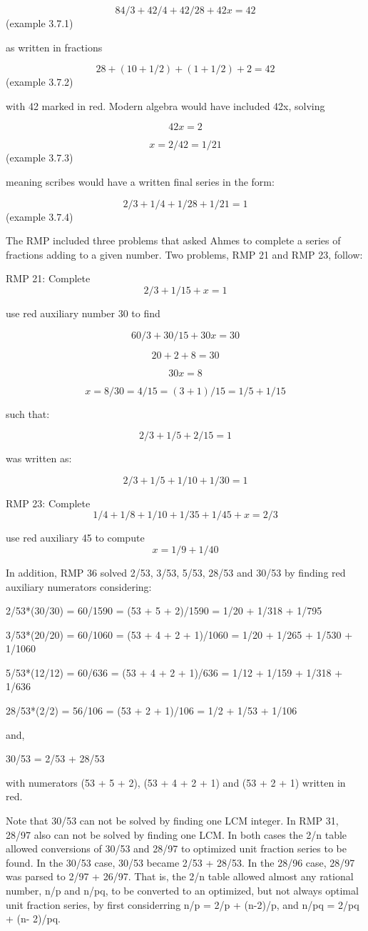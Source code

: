 \documentclass[12pt]{article}
\begin{document}
$$84/3 + 42/4 + 42/28 + 42x = 42$$ (example 3.7.1)

as written in fractions

$$28 + (10 + 1/2) + (1 + 1/2) + 2 = 42$$ (example 3.7.2)

with 42 marked in red. Modern algebra would have included 42x, solving

$$42x = 2$$

$$x = 2/42 = 1/21$$ (example 3.7.3)

meaning scribes would have a written final series in the form:

$$2/3 + 1/4 + 1/28 + 1/21 = 1$$ (example 3.7.4)

The RMP included three problems that asked Ahmes to complete a series of fractions adding to a given number. Two problems, RMP 21 and RMP 23, follow: 

RMP 21: Complete  $$2/3 + 1/15 + x = 1$$

use red auxiliary number 30 to find 

$$60/3 + 30/15 + 30x = 30$$
 
$$20 + 2 + 8 = 30$$

$$30x = 8$$

$$x = 8/30 = 4/15 = (3 + 1)/15 = 1/5 + 1/15$$

such that:

$$2/3 + 1/5 + 2/15 = 1$$

was written as:

$$2/3 + 1/5 + 1/10 + 1/30 = 1$$

RMP 23: Complete $$1/4 + 1/8 + 1/10 + 1/35 + 1/45 + x = 2/3$$

use red auxiliary 45 to compute $$x = 1/9 + 1/40$$

In addition, RMP 36 solved 2/53, 3/53, 5/53, 28/53 and 30/53 by finding red auxiliary numerators considering:

2/53*(30/30) = 60/1590 = (53 + 5 + 2)/1590 = 1/20 + 1/318 + 1/795

3/53*(20/20) = 60/1060 = (53 + 4 + 2 + 1)/1060 = 1/20 + 1/265 + 1/530 + 1/1060

5/53*(12/12) = 60/636 = (53 + 4 + 2 + 1)/636 = 1/12 + 1/159 + 1/318 + 1/636

28/53*(2/2) = 56/106 = (53 + 2 + 1)/106 = 1/2 + 1/53 + 1/106  

and,

30/53 = 2/53 + 28/53

with numerators (53 + 5 + 2), (53 + 4 + 2 + 1) and (53 + 2 + 1) written in red.

Note that 30/53 can not be solved by finding one LCM integer. In RMP 31, 28/97 also can not be solved by finding one LCM. In both cases the 2/n table allowed conversions of 30/53 and 28/97 to optimized unit fraction series to be found. In the 30/53 case, 30/53 became 2/53 + 28/53. In the 28/96 case, 28/97 was parsed to 2/97 + 26/97. That is, the 2/n table allowed almost any rational number, n/p and n/pq, to be converted to an optimized, but not always optimal unit fraction series, by first considerring n/p = 2/p + (n-2)/p, and n/pq = 2/pq + (n- 2)/pq.   
\end{document}

